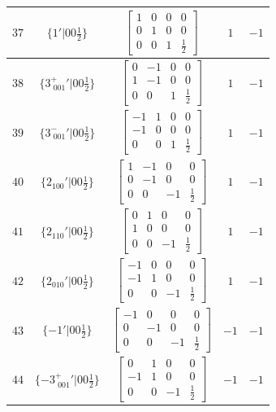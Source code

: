 \documentclass[fleqn,8pt]{jsarticle}
\begin{document}
\begin{longtable}{ccccc}
$ 37 $ & $ \{1{}'|0 0 \frac{1}{2}\} $ & $ \begin{bmatrix} 1 & 0 & 0 & 0 \\ 0 & 1 & 0 & 0 \\ 0 & 0 & 1 & \frac{1}{2} \end{bmatrix} $ & $ 1 $ & $ -1 $ \\ \hline
$ 38 $ & $ \{3^{+}_{\,\,001}{}'|0 0 \frac{1}{2}\} $ & $ \begin{bmatrix} 0 & -1 & 0 & 0 \\ 1 & -1 & 0 & 0 \\ 0 & 0 & 1 & \frac{1}{2} \end{bmatrix} $ & $ 1 $ & $ -1 $ \\ \hline
$ 39 $ & $ \{3^{-}_{\,\,001}{}'|0 0 \frac{1}{2}\} $ & $ \begin{bmatrix} -1 & 1 & 0 & 0 \\ -1 & 0 & 0 & 0 \\ 0 & 0 & 1 & \frac{1}{2} \end{bmatrix} $ & $ 1 $ & $ -1 $ \\ \hline
$ 40 $ & $ \{2{}_{100}{}'|0 0 \frac{1}{2}\} $ & $ \begin{bmatrix} 1 & -1 & 0 & 0 \\ 0 & -1 & 0 & 0 \\ 0 & 0 & -1 & \frac{1}{2} \end{bmatrix} $ & $ 1 $ & $ -1 $ \\ \hline
$ 41 $ & $ \{2{}_{110}{}'|0 0 \frac{1}{2}\} $ & $ \begin{bmatrix} 0 & 1 & 0 & 0 \\ 1 & 0 & 0 & 0 \\ 0 & 0 & -1 & \frac{1}{2} \end{bmatrix} $ & $ 1 $ & $ -1 $ \\ \hline
$ 42 $ & $ \{2{}_{010}{}'|0 0 \frac{1}{2}\} $ & $ \begin{bmatrix} -1 & 0 & 0 & 0 \\ -1 & 1 & 0 & 0 \\ 0 & 0 & -1 & \frac{1}{2} \end{bmatrix} $ & $ 1 $ & $ -1 $ \\ \hline
$ 43 $ & $ \{-1{}'|0 0 \frac{1}{2}\} $ & $ \begin{bmatrix} -1 & 0 & 0 & 0 \\ 0 & -1 & 0 & 0 \\ 0 & 0 & -1 & \frac{1}{2} \end{bmatrix} $ & $ -1 $ & $ -1 $ \\ \hline
$ 44 $ & $ \{-3^{+}_{\,\,001}{}'|0 0 \frac{1}{2}\} $ & $ \begin{bmatrix} 0 & 1 & 0 & 0 \\ -1 & 1 & 0 & 0 \\ 0 & 0 & -1 & \frac{1}{2} \end{bmatrix} $ & $ -1 $ & $ -1 $ \\ \hline

\end{longtable}
\end{document}
